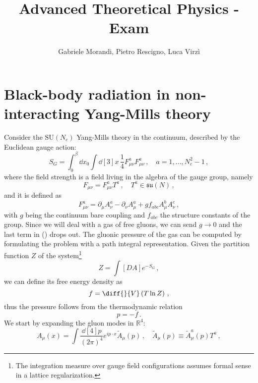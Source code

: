 \documentclass{article}
\title{Advanced Theoretical Physics - Exam}
\author{Gabriele Morandi, Pietro Rescigno, Luca Virzì}
\begin{document}
\maketitle





\section{Black-body radiation in non-interacting Yang-Mills theory}

Consider the $\mathrm{SU}(N_c)$  Yang-Mills theory in the continuum, described by the Euclidean gauge action:
\begin{equation}\label{eq: action}
    S_G = \int_0^\beta \dd{x_0} \int \dd[3]{x} \, \frac{1}{4} F_{\mu\nu}^a F_{\mu\nu}^a \, , \quad a = 1, \dots, N_c^2 - 1 \, ,
\end{equation}
where the field strength is a field living in the algebra of the gauge group, namely
\begin{equation}\label{eq: f}
    F_{\mu\nu} = F_{\mu\nu}^a T^a \, , \quad T^a \in \mathfrak{su}(N) \, ,
\end{equation}
and it is defined as
\begin{equation}\label{eq: field_strength}
    F_{\mu\nu}^a = \partial_\mu A_\nu^a - \partial_\nu A_\mu^a + g f_{abc} A_\mu^b A_\nu^c \, , 
\end{equation}
with $g$ being the continuum bare coupling and $f_{abc}$ the structure constants of the group.
Since we will deal with a gas of free gluons, we can send $g \to 0$ and the last term in () drops out.
The gluonic pressure of the gas can be computed by formulating the problem with a path integral representation.
Given the partition function $Z$ of the system\footnote{The integration measure over gauge field configurations assumes formal sense in a lattice regularization.}
\begin{equation}\label{eq: Z}
    Z = \int \left[ DA \right] e^{-S_G} \, ,
\end{equation}
we can define its free energy density as
\begin{equation}
    f = \diff{}{V}\left(T \ln Z \right) \, ,
\end{equation}
thus the pressure follows from the thermodynamic relation
\begin{equation}
    p = -f \, .
\end{equation}
We start by expanding the gluon modes in $\mathbb{R}^4$:
\begin{equation}
    A_\mu (x) = \int \frac{\dd[4]{p}}{(2\pi)^4} e^{i p \cdot x} \tilde{A}_\mu (p) \, , \quad \tilde{A}_\mu (p) \equiv \tilde{A}_\mu^a (p) T^a \, ,
\end{equation}
\end{document}
